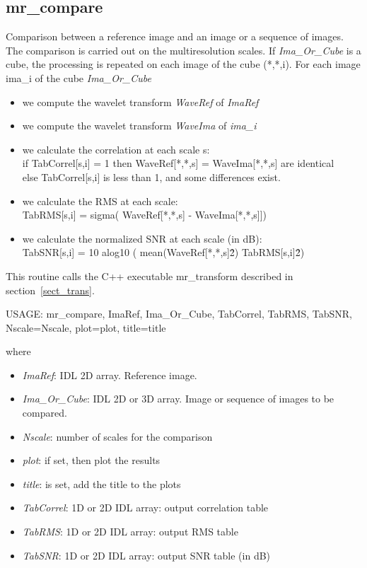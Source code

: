 \subsection{mr\_compare}
Comparison between a reference image and an image or a sequence of images.
The comparison is carried out on the multiresolution scales.
If {\em Ima\_Or\_Cube} is a cube,  
the processing is repeated on each image of the
cube (*,*,i).
For each image {ima\_i} of the cube {\em Ima\_Or\_Cube} 
\begin{itemize}
\item  we compute the wavelet transform {\em WaveRef} of {\em ImaRef}
\item  we compute the wavelet transform {\em WaveIma} of {\em  ima\_i}
\item  we calculate the  correlation at each scale s: \\
if TabCorrel[s,i] = 1 then WaveRef[*,*,s] = WaveIma[*,*,s] are identical \\
else TabCorrel[s,i] is less than 1, and some differences exist.
\item  we calculate the  RMS at each scale:    \\
  TabRMS[s,i] = sigma( WaveRef[*,*,s] - WaveIma[*,*,s]])
\item  we calculate the normalized SNR at each scale (in dB): \\
  TabSNR[s,i] = 10 alog10 ( mean(WaveRef[*,*,s]\^2) \/ TabRMS[s,i]\^2)
\end{itemize}
This routine  calls the C++ 
executable {mr\_transform} described in section~\ref{sect_trans}.

{\bf
\begin{center}
     USAGE:  mr\_compare, ImaRef, Ima\_Or\_Cube, TabCorrel, TabRMS, TabSNR, Nscale=Nscale, plot=plot, title=title
\end{center}}
where 
\begin{itemize}
\item {\em ImaRef}: IDL 2D array. Reference image.
\item {\em Ima\_Or\_Cube}:  IDL 2D or 3D array.  Image or sequence of images 
to be compared.
\item {\em Nscale}: number of scales for the comparison
\item {\em plot}: if set, then plot the results
\item {\em title}:  is set, add the title to the plots
\item {\em TabCorrel}:  1D or 2D IDL array: output correlation table
\item {\em TabRMS}:  1D or 2D IDL array: output RMS table
\item {\em TabSNR}:  1D or 2D IDL array: output SNR table (in dB)
\end{itemize}
